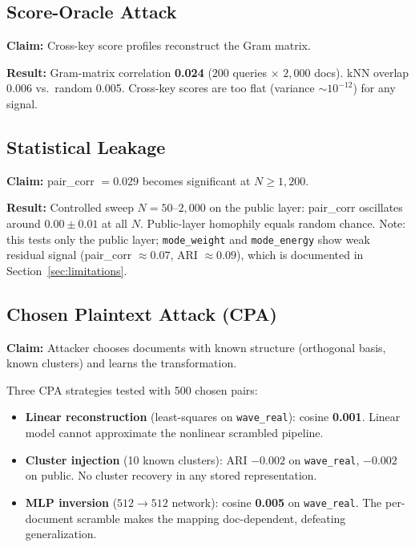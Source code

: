 \documentclass{article}
\begin{document}
\subsection{Score-Oracle Attack}
\label{sec:score-oracle}

\textbf{Claim:} Cross-key score profiles reconstruct the Gram matrix.

\textbf{Result:} Gram-matrix correlation \textbf{0.024} ($200$ queries $\times$ $2{,}000$ docs).
kNN overlap 0.006 vs.\ random 0.005.
Cross-key scores are too flat (variance ${\sim}10^{-12}$) for any signal.

\subsection{Statistical Leakage}

\textbf{Claim:} pair\_corr $= 0.029$ becomes significant at $N \geq 1{,}200$.

\textbf{Result:} Controlled sweep $N{=}50$--$2{,}000$ on the public layer: pair\_corr oscillates around $\mathbf{0.00 \pm 0.01}$ at all $N$.
Public-layer homophily equals random chance.
Note: this tests only the public layer; \texttt{mode\_weight} and \texttt{mode\_energy} show weak residual signal (pair\_corr $\approx 0.07$, ARI $\approx 0.09$), which is documented in Section~\ref{sec:limitations}.

\subsection{Chosen Plaintext Attack (CPA)}
\label{sec:cpa}

\textbf{Claim:} Attacker chooses documents with known structure (orthogonal basis, known clusters) and learns the transformation.

Three CPA strategies tested with 500 chosen pairs:
\begin{itemize}[nosep]
  \item \textbf{Linear reconstruction} (least-squares on \texttt{wave\_real}): cosine \textbf{0.001}. Linear model cannot approximate the nonlinear scrambled pipeline.
  \item \textbf{Cluster injection} (10 known clusters): ARI $\mathbf{-0.002}$ on \texttt{wave\_real}, $\mathbf{-0.002}$ on public. No cluster recovery in any stored representation.
  \item \textbf{MLP inversion} ($512 \to 512$ network): cosine \textbf{0.005} on \texttt{wave\_real}. The per-document scramble makes the mapping doc-dependent, defeating generalization.
\end{itemize}
\end{document}
